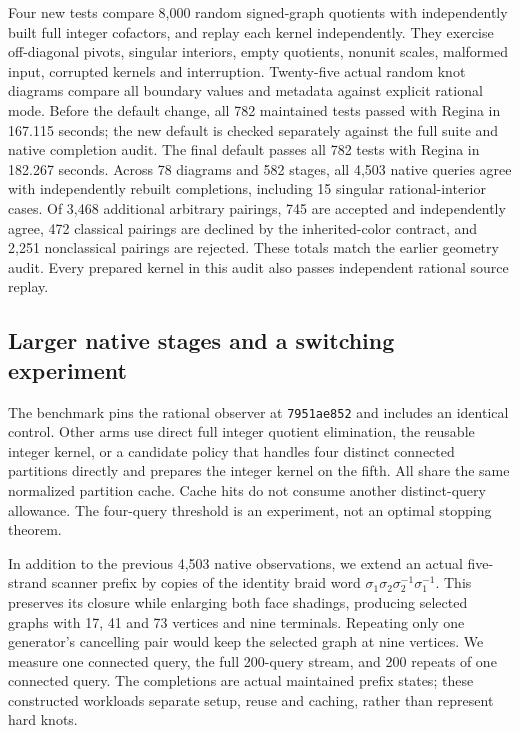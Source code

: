 Four new tests compare 8,000 random signed-graph quotients with independently
built full integer cofactors, and replay each kernel independently. They
exercise off-diagonal pivots, singular interiors, empty quotients, nonunit
scales, malformed input, corrupted kernels and interruption. Twenty-five
actual random knot diagrams compare all boundary values and metadata against
explicit rational mode. Before the default change, all 782 maintained tests
passed with Regina in 167.115 seconds; the new default is checked separately
against the full suite and native completion audit. The final default passes
all 782 tests with Regina in 182.267 seconds. Across 78 diagrams and 582
stages, all 4,503 native queries agree with independently rebuilt completions,
including 15 singular rational-interior cases. Of 3,468 additional arbitrary
pairings, 745 are accepted and independently agree, 472 classical pairings
are declined by the inherited-color contract, and 2,251 nonclassical pairings
are rejected. These totals match the earlier geometry audit. Every prepared
kernel in this audit also passes independent rational source replay.

\subsection{Larger native stages and a switching experiment}

The benchmark pins the rational observer at \texttt{7951ae852} and includes
an identical control. Other arms use direct full integer quotient elimination,
the reusable integer kernel, or a candidate policy that handles four distinct
connected partitions directly and prepares the integer kernel on the fifth.
All share the same normalized partition cache. Cache hits do not consume
another distinct-query allowance. The four-query threshold is an experiment,
not an optimal stopping theorem.

In addition to the previous 4,503 native observations, we extend an actual
five-strand scanner prefix by copies of the identity braid word
$\sigma_1\sigma_2\sigma_2^{-1}\sigma_1^{-1}$. This preserves its closure
while enlarging both face shadings, producing selected graphs with 17, 41
and 73 vertices and nine terminals. Repeating only one generator's cancelling
pair would keep the selected graph at nine vertices. We measure one connected
query, the full 200-query stream, and 200 repeats of one connected query.
The completions are actual maintained prefix states; these constructed
workloads separate setup, reuse and caching, rather than represent hard knots.

